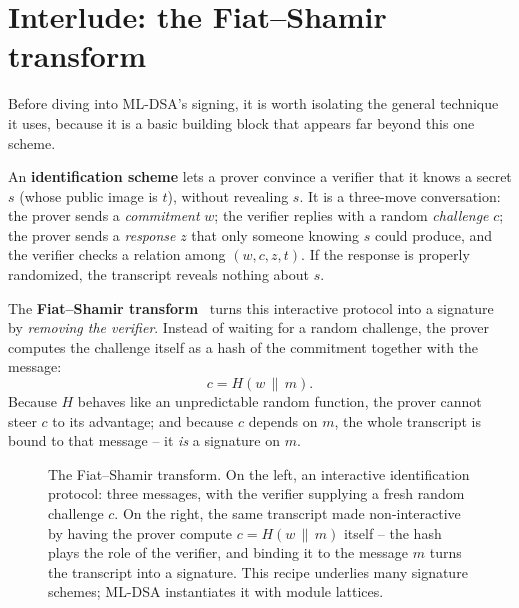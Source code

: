 \section{Interlude: the Fiat--Shamir transform}
\label{sec:fiat-shamir}

Before diving into ML-DSA's signing, it is worth isolating the general technique it uses, because it is a basic building block that appears far beyond this one scheme.

An \textbf{identification scheme} lets a prover convince a verifier that it knows a secret $s$ (whose public image is $t$), without revealing $s$. It is a three-move conversation: the prover sends a \emph{commitment} $w$; the verifier replies with a random \emph{challenge} $c$; the prover sends a \emph{response} $z$ that only someone knowing $s$ could produce, and the verifier checks a relation among $(w,c,z,t)$. If the response is properly randomized, the transcript reveals nothing about $s$.

The \textbf{Fiat--Shamir transform}~\cite{fiatshamir1986} turns this interactive protocol into a signature by \emph{removing the verifier}. Instead of waiting for a random challenge, the prover computes the challenge itself as a hash of the commitment together with the message:
\[
c = H(w \,\|\, m).
\]
Because $H$ behaves like an unpredictable random function, the prover cannot steer $c$ to its advantage; and because $c$ depends on $m$, the whole transcript is bound to that message -- it \emph{is} a signature on $m$.

\begin{figure}[H]
\centering
{}
\caption{The Fiat--Shamir transform. On the left, an interactive identification protocol: three messages, with the verifier supplying a fresh random challenge $c$. On the right, the same transcript made non-interactive by having the prover compute $c=H(w\,\|\,m)$ itself -- the hash plays the role of the verifier, and binding it to the message $m$ turns the transcript into a signature. This recipe underlies many signature schemes; ML-DSA instantiates it with module lattices.}
\label{fig:fiat-shamir}
\end{figure}

